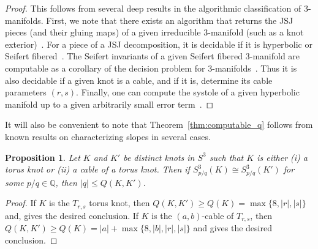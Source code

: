 \documentclass{amsart} %
\newcommand{\Q}{\mathbb{Q}}
\theoremstyle{thm}
\newtheorem{prop}[Theorem]{Proposition}
\theoremstyle{definition}
\numberwithin{equation}{section}
\begin{document}
\begin{proof}
This follows from several deep results in the algorithmic classification of $3$-manifolds. First, we note that there exists an algorithm that returns the JSJ pieces (and their gluing maps) of a given irreducible $3$-manifold (such as a knot exterior)~\cite[Theorem~6.4.42]{Matveev}. For a piece of a JSJ decomposition, it is decidable if it is hyperbolic or Seifert fibered~\cite{decide_hyperbolic}. The Seifert invariants of a given Seifert fibered $3$-manifold are computable as a corollary of the decision problem for $3$-manifolds~\cite{Kuperberg2019homeomorphism}. Thus it is also decidable if a given knot is a cable, and if it is, determine its cable parameters $(r,s)$. Finally, one can compute the systole of a given hyperbolic manifold up to a given arbitrarily small error term~\cite{length_spectrum_computable}. 
\end{proof}


    It will also be convenient to note that Theorem~\ref{thm:computable_q} follows from known results on characterizing slopes in several cases.
\begin{prop}\label{prop:computable_q_cases}
    Let $K$ and $K'$ be distinct knots in $S^3$ such that $K$ is either (i) a torus knot or (ii) a cable of a torus knot. Then if $S_{p/q}^3(K)\cong S_{p/q}^3(K')$ for some $p/q\in \Q$, then $|q|\leq Q(K,K')$.
\end{prop}
\begin{proof}
If $K$ is the $T_{r,s}$ torus knot, then $Q(K,K')\geq Q(K)=\max\{8,|r|,|s|\}$ and, \cite[Theorem~1.1]{McCoy2020torus_char} gives the desired conclusion. If $K$ is the $(a,b)$-cable of $T_{r,s}$, then $Q(K,K')\geq Q(K)=|a|+\max\{8,|b|,|r|,|s|\}$ and \cite[Theorem~7.3(iii)]{Sorya2023satellite} gives the desired conclusion.
\end{proof}
\end{document}
